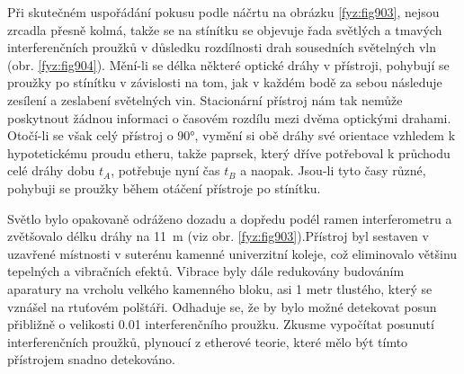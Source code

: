 \begin{mdframed}[style=mdexam]
  \begin{example}\label{fyz:fey_exam016}
    Při skutečném uspořádání pokusu podle náčrtu na obrázku \ref{fyz:fig903}, nejsou zrcadla přesně
    kolmá, takže se na stínítku se objevuje řada světlých a tmavých interferenčních proužků v
    důsledku rozdílnosti drah sousedních světelných vln (obr. \ref{fyz:fig904}). Mění-li se délka
    některé optické dráhy v přístroji, pohybují se proužky po stínítku v závislosti na tom, jak v
    každém bodě za sebou následuje zesílení a zeslabení světelných vin. Stacionární přístroj nám tak
    nemůže poskytnout žádnou informaci o časovém rozdílu mezi dvěma optickými drahami. Otočí-li se
    však celý přístroj o \ang{90}, vymění si obě dráhy své orientace vzhledem k hypotetickému proudu
    etheru, takže paprsek, který dříve potřeboval k průchodu celé dráhy dobu \(t_A\), potřebuje nyní
    čas \(t_B\) a naopak. Jsou-li tyto časy různé, pohybuji se proužky během otáčení přístroje po
    stínítku. \newline

    {\centering
    \captionsetup{type=figure}
    \par}
    \vspace{1em}

    Světlo bylo opakovaně odráženo dozadu a dopředu podél ramen interferometru a zvětšovalo délku
    dráhy na \SI{11}{\metre} (viz obr. \ref{fyz:fig903}).Přístroj byl sestaven v uzavřené místnosti
    v suterénu kamenné univerzitní koleje, což eliminovalo většinu tepelných a vibračních efektů.
    Vibrace byly dále redukovány budováním aparatury na vrcholu velkého kamenného bloku, asi 1 metr
    tlustého, který se vznášel na rtuťovém polštáři. Odhaduje se, že by bylo možné detekovat posun
    přibližně o velikosti \num{0.01} interferenčního proužku. Zkusme vypočítat posunutí
    interferenčních proužků, plynoucí z etherové teorie, které mělo být tímto přístrojem snadno
    detekováno. 

    {\centering
    \captionsetup{type=figure}
    \par}
    \vspace{1em}


\end{example}
\end{mdframed}
